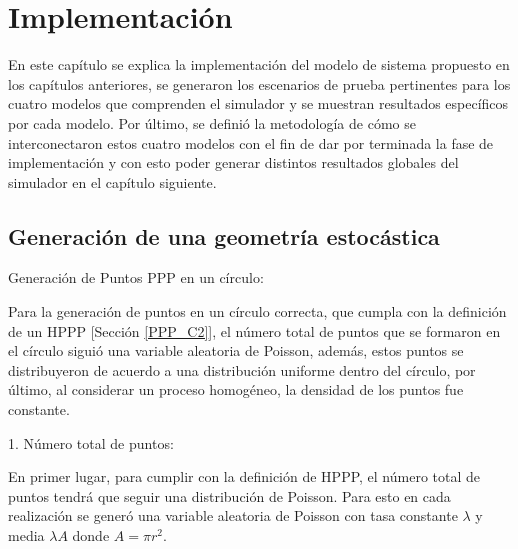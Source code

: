 
\chapter{Implementación} %

\label{Chapter6} %

En este capítulo se explica la implementación del modelo de sistema propuesto en los capítulos anteriores, se generaron los escenarios de prueba pertinentes para los cuatro modelos que comprenden el simulador y se muestran resultados específicos por cada modelo. Por último, se definió la metodología de cómo se interconectaron estos cuatro modelos con el fin de dar por terminada la fase de implementación y con esto poder generar distintos resultados globales del simulador en el capítulo siguiente.


\section{Generación de una geometría estocástica}\label{generarGeoEstocastica}

Generación de Puntos PPP en un círculo: \newline

Para la generación de puntos en un círculo correcta, que cumpla con la definición de un HPPP [Sección \ref{PPP_C2}], el número total de puntos que se formaron en el círculo siguió una variable aleatoria de Poisson, además, estos puntos se distribuyeron de acuerdo a una distribución uniforme dentro del círculo, por último, al considerar un proceso homogéneo, la densidad de los puntos fue constante.\newline

1. Número total de puntos:\newline

En primer lugar, para cumplir con la definición de HPPP, el número total de puntos tendrá que seguir una distribución de Poisson. Para esto en cada realización se generó una variable aleatoria de Poisson con tasa constante $\lambda$ y media $\lambda A$ donde $A=\pi r^{2}$. \newline

